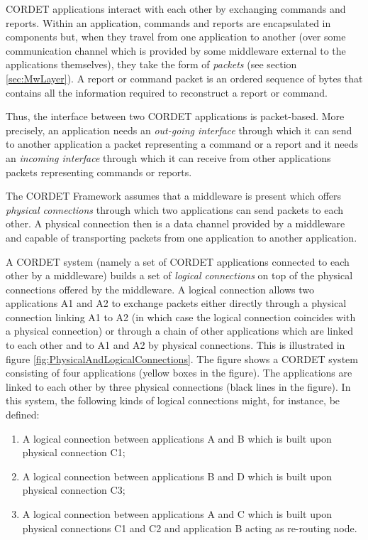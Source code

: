 \documentclass{pnp_article}
\begin{document}
CORDET applications interact with each other by exchanging commands and reports. Within an application, commands and reports are encapsulated in components but, when they travel from one application to another (over some communication channel which is provided by some middleware external to the applications themselves), they take the form of \textit{packets} (see section \ref{sec:MwLayer}). A report or command packet is an ordered sequence of bytes that contains all the information required to reconstruct a report or command. 

Thus, the interface between two CORDET applications is packet-based. More precisely, an application needs an \textit{out-going interface} through which it can send to another application a packet representing a command or a report and it needs an \textit{incoming interface} through which it can receive from other applications packets representing commands or reports.  

The CORDET Framework assumes that a middleware is present which offers \textit{physical connections} through which two applications can send packets to each other. A physical connection then is a data channel provided by a middleware and capable of transporting packets from one application to another application. 

A CORDET system (namely a set of CORDET applications connected to each other by a middleware) builds a set of \textit{logical connections} on top of the physical connections offered by the middleware. A logical connection allows two applications A1 and A2 to exchange packets either directly through a physical connection linking A1 to A2 (in which case the logical connection coincides with a physical connection) or through a chain of other applications which are linked to each other and to A1 and A2 by physical connections. This is illustrated in figure \ref{fig:PhysicalAndLogicalConnections}. The figure shows a CORDET system consisting of four applications (yellow boxes in the figure). The applications are linked to each other by three physical connections (black lines in the figure). In this system, the following kinds of logical connections might, for instance, be defined:

\begin{enumerate}
\item A logical connection between applications A and B which is built upon physical connection C1;
\item A logical connection between applications B and D which is built upon physical connection C3;
\item A logical connection between applications A and C which is built upon physical connections C1 and C2 and application B acting as re-routing node.
\end{enumerate}
\end{document}
